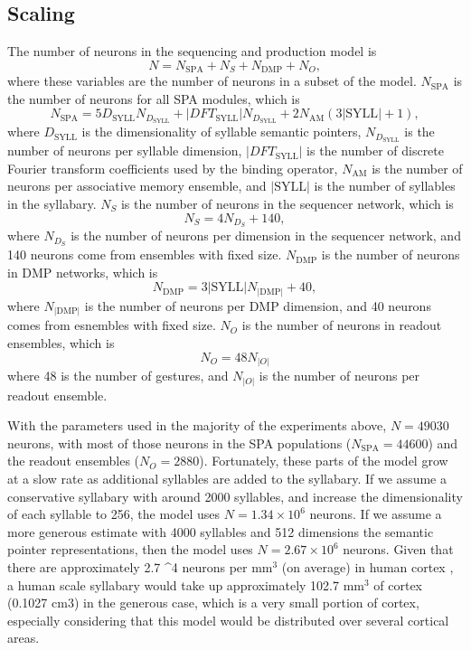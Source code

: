 \subsection{Scaling}
\label{sec:res-prod-scaling}

The number of neurons in the
sequencing and production model is
\begin{equation}
  N = N_{\text{SPA}} + N_S + N_{\text{DMP}} + N_O,
\end{equation}
where these variables
are the number of neurons in
a subset of the model.
$N_{\text{SPA}}$ is the number of
neurons for all SPA modules,
which is
\begin{equation}
  N_{\text{SPA}} = 5 D_{\text{SYLL}} N_D_{\text{SYLL}} +
      |DFT_{\text{SYLL}}| N_D_{\text{SYLL}}
      + 2 N_{\text{AM}} (3 |\text{SYLL}| + 1),
\end{equation}
where $D_{\text{SYLL}}$ is the dimensionality
of syllable semantic pointers,
$N_D_{\text{SYLL}}$ is the number of neurons
per syllable dimension,
$|DFT_{\text{SYLL}}|$ is the number of
discrete Fourier transform coefficients
used by the binding operator,
$N_{\text{AM}}$ is the number of neurons
per associative memory ensemble,
and $|\text{SYLL}|$ is the number of
syllables in the syllabary.
$N_S$ is the number of neurons
in the sequencer network,
which is
\begin{equation}
  N_S = 4 N_D_S + 140,
\end{equation}
where $N_D_S$ is the number of neurons
per dimension in the sequencer network,
and 140 neurons come from ensembles
with fixed size.
$N_{\text{DMP}}$ is the number of neurons
in DMP networks, which is
\begin{equation}
  N_{\text{DMP}} = 3 |\text{SYLL}| N_{|\text{DMP}|} + 40,
\end{equation}
where $N_{|\text{DMP}|}$ is the number of neurons
per DMP dimension,
and 40 neurons comes from esnembles with fixed size.
$N_O$ is the number of neurons
in readout ensembles, which is
\begin{equation}
  N_O = 48 N_{|O|}
\end{equation}
where 48 is the number of gestures,
and $N_{|O|}$ is the number of neurons
per readout ensemble.

With the parameters used
in the majority of the experiments above,
$N=49030$ neurons,
with most of those neurons
in the SPA populations
($N_{\text{SPA}}=44600$)
and the readout ensembles ($N_O=2880$).
Fortunately, these parts of the model
grow at a slow rate
as additional syllables are added
to the syllabary.
If we assume a conservative syllabary
with around 2000 syllables,
and increase the dimensionality
of each syllable to 256,
the model uses
$N=1.34 \times 10^6$ neurons.
If we assume a more generous estimate
with 4000 syllables
and 512 dimensions
the semantic pointer representations,
then the model uses
$N=2.67 \times 10^6$ neurons.
Given that there are approximately
2.7 ^4 neurons per mm$^3$ (on average)
in human cortex \cite[BNID 112050]{milo2010},
a human scale syllabary would take up
approximately 102.7 mm$^3$ of cortex
(0.1027 cm$3$)
in the generous case,
which is a very small portion of cortex,
especially considering that this model
would be distributed over
several cortical areas.

